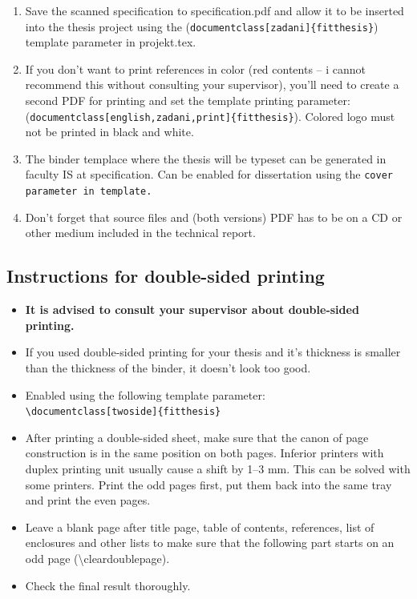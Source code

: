 \begin{enumerate}
  \item Save the scanned specification to specification.pdf and allow it to be inserted into the thesis project using the (\verb|documentclass[zadani]{fitthesis}|) template parameter in projekt.tex.
  \item If you don't want to print references in color (red contents -- i cannot recommend this without consulting your supervisor), you'll need to create a second PDF for printing and set the template printing parameter:\\ (\verb|documentclass[english,zadani,print]{fitthesis}|). Colored logo must not be printed in black and white.
  \item The binder templace where the thesis will be typeset can be generated in faculty IS at specification. Can be enabled for dissertation using the \tt cover \rm parameter in template.
  \item Don't forget that source files and (both versions) PDF has to be on a CD or other medium included in the technical report.
\end{enumerate}

\subsection*{Instructions for double-sided printing}
\begin{itemize}
\item \textbf{It is advised to consult your supervisor about double-sided printing.}
\item If you used double-sided printing for your thesis and it's thickness is smaller than the thickness of the binder, it doesn't look too good.
\item Enabled using the following template parameter:\\ \verb|\documentclass[twoside]{fitthesis}|
\item After printing a double-sided sheet, make sure that the canon of page construction is in the same position on both pages. Inferior printers with duplex printing unit usually cause a shift by 1--3 mm. This can be solved with some printers. Print the odd pages first, put them back into the same tray and print the even pages.
\item Leave a blank page after title page, table of contents, references, list of enclosures and other lists to make sure that the following part starts on an odd page (\textbackslash cleardoublepage).
\item Check the final result thoroughly.
\end{itemize}


